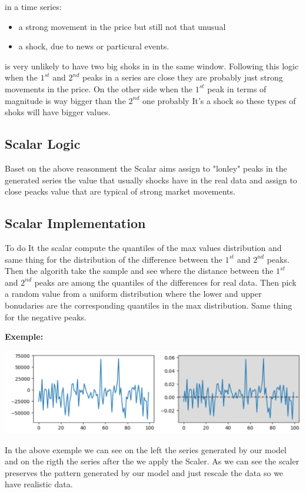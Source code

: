 \documentclass{article}
\begin{document}
\begin{multicols}{2}
    in a time series:
    \begin{itemize}
        \item a strong movement in the price but still not that unusual
        \item a shock, due to news or particural events.
    \end{itemize}  
    is very unlikely to have two big shoks in in the same window. Following this logic when the $1^{st}$ and $2^{nd}$ peaks in a series 
    are close they are probably just strong movements in the price. On the other side when the $1^{st}$ peak in terms of magnitude is way bigger 
    than the $2^{nd}$ one probably It's a shock so these types of shoks will have bigger values.
    \subsection*{Scalar Logic}
    Baset on the above reasonment the Scalar aims assign to "lonley" peaks in the generated series the value that usually shocks have in the real data 
    and assign to close peacks value that are typical of strong market movements.
    \subsection*{Scalar Implementation}
    To do It the scalar compute the quantiles of the max values distribution and same thing for the distribution of the difference between the $1^{st}$ and 
    $2^{nd}$ peaks.\\
    Then the algorith take the sample and see where the distance between the $1^{st}$ and $2^{nd}$ peaks are among the quantiles of the differences for real 
    data. Then pick a random value from a uniform distribution where the lower and upper bonudaries are the corresponding quantiles in the max distribution. 
    Same thing for the negative peaks.
    \end{multicols}
    \textbf{Exemple:}
    \begin{center}
        \includegraphics[scale=0.6]{imgs/EX_03.png}
    \end{center}
    In the above exemple we can see on the left the series generated by our model and on the rigth the series after the we apply the Scaler. As we can see 
    the scaler preserves the pattern generated by our model and just rescale the data so we have realistic data.
\end{document}
